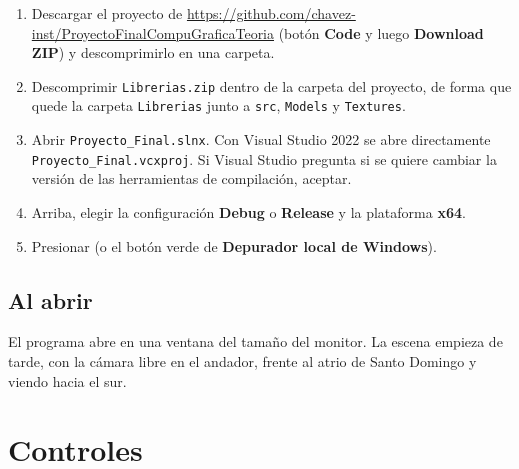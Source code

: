 \documentclass[11pt,a4paper]{article}
\begin{document}
\begin{enumerate}
  \item Descargar el proyecto de \url{https://github.com/chavez-inst/ProyectoFinalCompuGraficaTeoria} (botón \textbf{Code} y luego \textbf{Download ZIP}) y descomprimirlo en una carpeta.
  \item Descomprimir \texttt{Librerias.zip} dentro de la carpeta del proyecto, de forma que quede la carpeta \texttt{Librerias} junto a \texttt{src}, \texttt{Models} y \texttt{Textures}.
  \item Abrir \texttt{Proyecto\_Final.slnx}. Con Visual Studio 2022 se abre directamente \nolinkurl{Proyecto_Final.vcxproj}. Si Visual Studio pregunta si se quiere cambiar la versión de las herramientas de compilación, aceptar.
  \item Arriba, elegir la configuración \textbf{Debug} o \textbf{Release} y la plataforma \textbf{x64}.
  \item Presionar  (o el botón verde de \textbf{Depurador local de Windows}).
\end{enumerate}

\subsection{Al abrir}

El programa abre en una ventana del tamaño del monitor. La escena empieza de tarde, con la cámara libre en el andador, frente al atrio de Santo Domingo y viendo hacia el sur.


\clearpage
\section{Controles}
\end{document}
